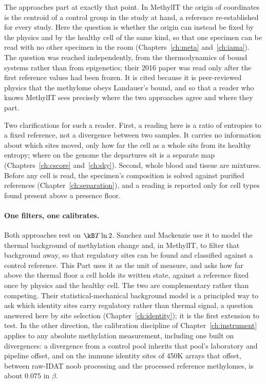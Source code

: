 The approaches part at exactly that point. In MethylIT the origin of coordinates is the centroid of a control group in the study at hand, a
reference re-established for every study. Here the question is whether the origin can instead be fixed by the physics and by the healthy cell of
the same kind, so that one specimen can be read with no other specimen in the room (Chapters~\ref{ch:meta} and~\ref{ch:iama}). The question was reached independently, from the thermodynamics of bound systems rather than from
epigenetics; their 2016 paper was read only after the first reference values had been frozen. It is cited because it is
peer-reviewed physics that the methylome obeys Landauer's bound, and so that a reader who knows MethylIT sees precisely where the two
approaches agree and where they part.

Two clarifications for such a reader. First, a reading here is a ratio of entropies to a fixed reference, not a divergence between two samples.
It carries no information about which sites moved, only how far the cell as a whole sits from its healthy entropy; where on the genome the
departures sit is a separate map (Chapters~\ref{ch:cscore} and~\ref{ch:sky}). Second, whole blood and tissue are mixtures. Before any cell is
read, the specimen's composition is solved against purified references (Chapter~\ref{ch:separation}), and a reading is reported only for cell
types found present above a presence floor.

\paragraph{One filters, one calibrates.} Both approaches rest on $\kB T\ln2$. Sanchez and Mackenzie use it to model the thermal background of
methylation change and, in MethylIT, to filter that background away, so that regulatory sites can be found and classified against a control
reference. This Part uses it as the unit of measure, and asks how far above the thermal floor a cell holds its written state, against a
reference fixed once by physics and the healthy cell. The two are complementary rather than competing. Their statistical-mechanical background
model is a principled way to ask which identity sites carry regulatory rather than thermal signal, a question answered here by site selection
(Chapter~\ref{ch:identity}); it is the first extension to test. \openprob{} In the other direction, the calibration discipline of
Chapter~\ref{ch:instrument} applies to any absolute methylation measurement, including one built on divergences: a
divergence from a control pool inherits that pool's laboratory and pipeline offset, and on the immune identity sites of 450K arrays that offset,
between raw-IDAT noob processing and the processed reference methylomes, is about $0.075$ in $\beta$. \measured

